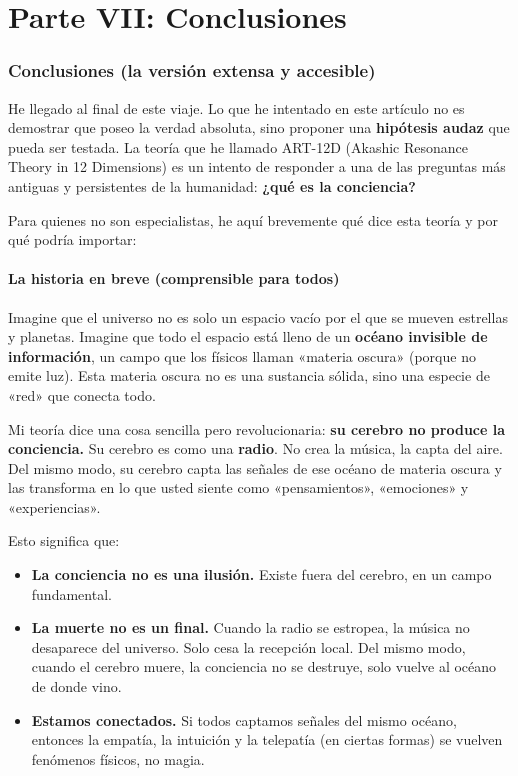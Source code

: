 \part*{Parte VII: Conclusiones}

\section{Conclusiones (la versión extensa y accesible)}
He llegado al final de este viaje. Lo que he intentado en este artículo no es demostrar que poseo la verdad absoluta, sino proponer una \textbf{hipótesis audaz} que pueda ser testada. La teoría que he llamado ART-12D (Akashic Resonance Theory in 12 Dimensions) es un intento de responder a una de las preguntas más antiguas y persistentes de la humanidad: \textbf{¿qué es la conciencia?}

Para quienes no son especialistas, he aquí brevemente qué dice esta teoría y por qué podría importar:

\subsection{La historia en breve (comprensible para todos)}
Imagine que el universo no es solo un espacio vacío por el que se mueven estrellas y planetas. Imagine que todo el espacio está lleno de un \textbf{océano invisible de información}, un campo que los físicos llaman «materia oscura» (porque no emite luz). Esta materia oscura no es una sustancia sólida, sino una especie de «red» que conecta todo.

Mi teoría dice una cosa sencilla pero revolucionaria: \textbf{su cerebro no produce la conciencia.} Su cerebro es como una \textbf{radio}. No crea la música, la capta del aire. Del mismo modo, su cerebro capta las señales de ese océano de materia oscura y las transforma en lo que usted siente como «pensamientos», «emociones» y «experiencias».

Esto significa que:
\begin{itemize}
    \item \textbf{La conciencia no es una ilusión.} Existe fuera del cerebro, en un campo fundamental.
    \item \textbf{La muerte no es un final.} Cuando la radio se estropea, la música no desaparece del universo. Solo cesa la recepción local. Del mismo modo, cuando el cerebro muere, la conciencia no se destruye, solo vuelve al océano de donde vino.
    \item \textbf{Estamos conectados.} Si todos captamos señales del mismo océano, entonces la empatía, la intuición y la telepatía (en ciertas formas) se vuelven fenómenos físicos, no magia.
\end{itemize}

